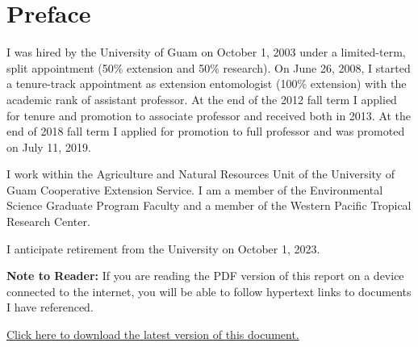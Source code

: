 %
\setcounter{secnumdepth}{0} %
\setcounter{tocdepth}{2}
\tableofcontents{}

\clearpage

\section{Preface}

I was hired by the University of Guam on October 1, 2003 under a limited-term,
split appointment (50\% extension and 50\% research). On June 26,
2008, I started a tenure-track appointment as extension entomologist
(100\% extension) with the academic rank of assistant professor. At
the end of the 2012 fall term I applied for tenure and promotion to associate professor and
received both in 2013. At the end of 2018 fall term I applied for promotion to
full professor and was promoted on July 11, 2019. 

I work within the Agriculture and Natural Resources Unit of the University
of Guam Cooperative Extension Service. I am a member of the
Environmental Science Graduate Program Faculty and a member of the Western
Pacific Tropical Research Center. 

I anticipate retirement from the University on October 1, 2023.

\vspace{0.5in}
\textbf{Note to Reader:}
If you are reading the PDF version of this report on a device connected
to the internet, you will be able to follow hypertext links to documents
I have referenced.

\href{https://aubreymoore.github.io/CFES2020-22/CFES2023.pdf}{Click here to download the latest version of this document.}

